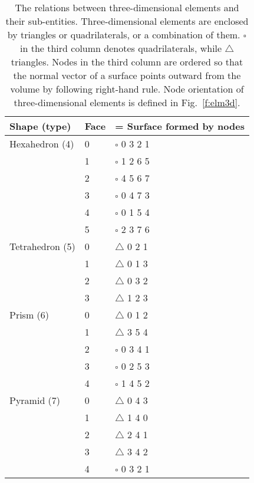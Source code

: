 \documentclass[11pt,dvips]{article}
\newcommand{\topcaption}{%
\setlength{\abovecaptionskip}{0pt}%
\setlength{\belowcaptionskip}{10pt}%
\caption}
\numberwithin{equation}{section}
\begin{document}
%
\begin{table}
\centering

\topcaption{
%
The relations between three-dimensional elements and their sub-entities.
Three-dimensional elements are enclosed by triangles or quadrilaterals, or a
combination of them.  $\square$ in the third column denotes quadrilaterals,
while $\triangle$ triangles.  Nodes in the third column are ordered so that the
normal vector of a surface points outward from the volume by following
right-hand rule.  Node orientation of three-dimensional elements is defined in
Fig.~\ref{f:elm3d}.
%
}

\label{t:subent3d}
\begin{tabular}{lll}
\toprule
Shape (type)    & Face & = Surface formed by nodes \\
\midrule
Hexahedron (4)  & 0    & $\square$ 0 3 2 1         \\
                & 1    & $\square$ 1 2 6 5         \\
                & 2    & $\square$ 4 5 6 7         \\
                & 3    & $\square$ 0 4 7 3         \\
                & 4    & $\square$ 0 1 5 4         \\
                & 5    & $\square$ 2 3 7 6         \\
\midrule
Tetrahedron (5) & 0    & $\triangle$ 0 2 1         \\
                & 1    & $\triangle$ 0 1 3         \\
                & 2    & $\triangle$ 0 3 2         \\
                & 3    & $\triangle$ 1 2 3         \\
\midrule
Prism (6)       & 0    & $\triangle$ 0 1 2         \\
                & 1    & $\triangle$ 3 5 4         \\
                & 2    & $\square$ 0 3 4 1         \\
                & 3    & $\square$ 0 2 5 3         \\
                & 4    & $\square$ 1 4 5 2         \\
\midrule
Pyramid (7)     & 0    & $\triangle$ 0 4 3         \\
                & 1    & $\triangle$ 1 4 0         \\
                & 2    & $\triangle$ 2 4 1         \\
                & 3    & $\triangle$ 3 4 2         \\
                & 4    & $\square$ 0 3 2 1         \\
\bottomrule
\end{tabular}
\end{table}
%
\end{document}
